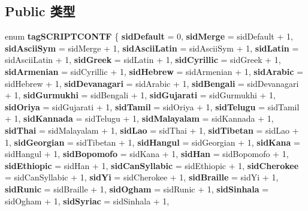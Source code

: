 \subsection*{Public 类型}
\begin{DoxyCompactItemize}
\item 
\mbox{\label{interface_multi_language_1_1_i_enum_script_a61835b06b0bf21342b480ab037597f5d}} 
enum {\bfseries tag\+S\+C\+R\+I\+P\+T\+C\+O\+N\+TF} \{ \newline
{\bfseries sid\+Default} = 0, 
{\bfseries sid\+Merge} = sid\+Default + 1, 
{\bfseries sid\+Ascii\+Sym} = sid\+Merge + 1, 
{\bfseries sid\+Ascii\+Latin} = sid\+Ascii\+Sym + 1, 
\newline
{\bfseries sid\+Latin} = sid\+Ascii\+Latin + 1, 
{\bfseries sid\+Greek} = sid\+Latin + 1, 
{\bfseries sid\+Cyrillic} = sid\+Greek + 1, 
{\bfseries sid\+Armenian} = sid\+Cyrillic + 1, 
\newline
{\bfseries sid\+Hebrew} = sid\+Armenian + 1, 
{\bfseries sid\+Arabic} = sid\+Hebrew + 1, 
{\bfseries sid\+Devanagari} = sid\+Arabic + 1, 
{\bfseries sid\+Bengali} = sid\+Devanagari + 1, 
\newline
{\bfseries sid\+Gurmukhi} = sid\+Bengali + 1, 
{\bfseries sid\+Gujarati} = sid\+Gurmukhi + 1, 
{\bfseries sid\+Oriya} = sid\+Gujarati + 1, 
{\bfseries sid\+Tamil} = sid\+Oriya + 1, 
\newline
{\bfseries sid\+Telugu} = sid\+Tamil + 1, 
{\bfseries sid\+Kannada} = sid\+Telugu + 1, 
{\bfseries sid\+Malayalam} = sid\+Kannada + 1, 
{\bfseries sid\+Thai} = sid\+Malayalam + 1, 
\newline
{\bfseries sid\+Lao} = sid\+Thai + 1, 
{\bfseries sid\+Tibetan} = sid\+Lao + 1, 
{\bfseries sid\+Georgian} = sid\+Tibetan + 1, 
{\bfseries sid\+Hangul} = sid\+Georgian + 1, 
\newline
{\bfseries sid\+Kana} = sid\+Hangul + 1, 
{\bfseries sid\+Bopomofo} = sid\+Kana + 1, 
{\bfseries sid\+Han} = sid\+Bopomofo + 1, 
{\bfseries sid\+Ethiopic} = sid\+Han + 1, 
\newline
{\bfseries sid\+Can\+Syllabic} = sid\+Ethiopic + 1, 
{\bfseries sid\+Cherokee} = sid\+Can\+Syllabic + 1, 
{\bfseries sid\+Yi} = sid\+Cherokee + 1, 
{\bfseries sid\+Braille} = sid\+Yi + 1, 
\newline
{\bfseries sid\+Runic} = sid\+Braille + 1, 
{\bfseries sid\+Ogham} = sid\+Runic + 1, 
{\bfseries sid\+Sinhala} = sid\+Ogham + 1, 
{\bfseries sid\+Syriac} = sid\+Sinhala + 1, 
\newline

\end{DoxyCompactItemize}
